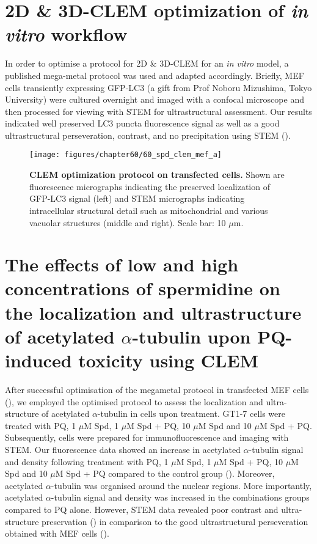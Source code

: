 \section{2D \& 3D-CLEM optimization of \textit{in vitro} workflow}
In order to optimise a protocol for 2D \& 3D-CLEM for an \textit{in vitro} model, a published mega-metal protocol was used \citep{Russell2017} and adapted accordingly. Briefly, MEF cells transiently expressing GFP-LC3 (a gift from Prof Noboru Mizushima, Tokyo University) were cultured overnight and imaged with a confocal microscope and then processed for viewing with STEM for ultrastructural assessment. Our results indicated well preserved LC3 puncta fluorescence signal as well as a good ultrastructural perseveration, contrast, and no precipitation using STEM (). 

\begin{figure}[!htbp]
\centering
  \texttt{[image: figures/chapter60/60\_spd\_clem\_mef\_a]}
  \caption[CLEM optimization protocol on transfected cells]{\textbf{CLEM optimization protocol on transfected cells.} Shown are fluorescence micrographs indicating the preserved localization of GFP-LC3 signal (left) and STEM micrographs indicating intracellular structural detail such as mitochondrial and various vacuolar structures (middle and right). Scale bar: 10 $\mu$m.}
  \label{fig:60_spd_clem_mef_a}
\end{figure} 

\section{The effects of low and high concentrations of spermidine on the localization and ultrastructure of acetylated $\alpha$-tubulin upon PQ-induced toxicity using CLEM}
\label{sec:Effect_low_high_spermidine_localization_ultrastructure of_tubulin_CLEM}
After successful optimisation of the megametal protocol in transfected MEF cells (), we employed the optimised protocol to assess the localization and ultra-structure of acetylated $\alpha$-tubulin in cells upon treatment. GT1-7 cells were treated with PQ, 1 $\mu$M Spd,  1 $\mu$M Spd + PQ, 10 $\mu$M Spd and 10 $\mu$M Spd + PQ. Subsequently, cells were prepared for immunofluorescence and imaging with STEM. Our fluorescence data showed an increase in acetylated $\alpha$-tubulin signal and density following treatment with PQ, 1 $\mu$M Spd, 1 $\mu$M Spd + PQ, 10 $\mu$M Spd and 10 $\mu$M Spd + PQ compared to the control group ().  Moreover, acetylated  $\alpha$-tubulin was  organised around the nuclear regions. More importantly, acetylated $\alpha$-tubulin signal and density was increased in the combinations groups compared to PQ alone. However, STEM data revealed poor contrast and ultra-structure preservation () in comparison to the good ultrastructural perseveration obtained with MEF cells (). 

